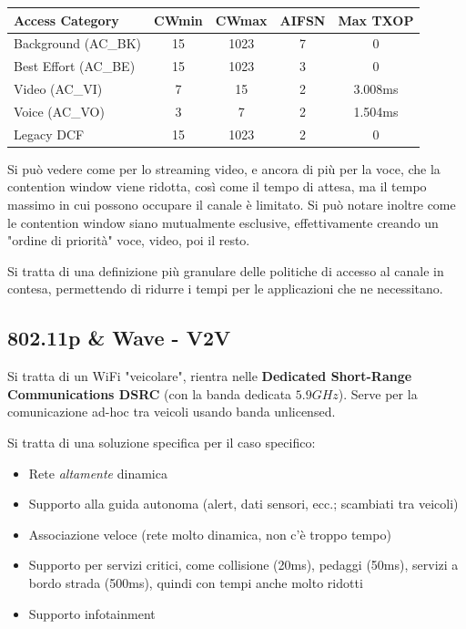 \begin{tabular}{|l|c|c|c|c|}
	\hline
	\textbf{Access Category} & \textbf{CWmin} & \textbf{CWmax} & \textbf{AIFSN} & \textbf{Max TXOP} \\ 
	\hline
	Background (AC\_BK) & 15 & 1023 & 7 & 0 \\ 
	\hline
	Best Effort (AC\_BE) & 15 & 1023 & 3 & 0 \\ 
	\hline
	Video (AC\_VI) & 7 & 15 & 2 & 3.008ms \\ 
	\hline
	Voice (AC\_VO) & 3 & 7 & 2 & 1.504ms \\ 
	\hline
	Legacy DCF & 15 & 1023 & 2 & 0 \\ 
	\hline
\end{tabular}

Si può vedere come per lo streaming video, e ancora di più per la voce, che la contention window viene ridotta, così come il tempo di attesa, ma il tempo massimo in cui possono occupare il canale è limitato. Si può notare inoltre come le contention window siano mutualmente esclusive, effettivamente creando un "ordine di priorità" voce, video, poi il resto.

Si tratta di una definizione più granulare delle politiche di accesso al canale in contesa, permettendo di ridurre i tempi per le applicazioni che ne necessitano.


\subsection{802.11p \& Wave - V2V}

Si tratta di un WiFi "veicolare", rientra nelle \textbf{Dedicated Short-Range Communications DSRC} (con la banda dedicata $5.9GHz$). Serve per la comunicazione ad-hoc tra veicoli usando banda unlicensed.

Si tratta di una soluzione specifica per il caso specifico: 
\begin{itemize}
	\item Rete \textit{altamente} dinamica
	\item Supporto alla guida autonoma (alert, dati sensori, ecc.; scambiati tra veicoli)
	\item Associazione veloce (rete molto dinamica, non c'è troppo tempo)
	\item Supporto per servizi critici, come collisione (20ms), pedaggi (50ms), servizi a bordo strada (500ms), quindi con tempi anche molto ridotti
	\item Supporto infotainment
\end{itemize}


